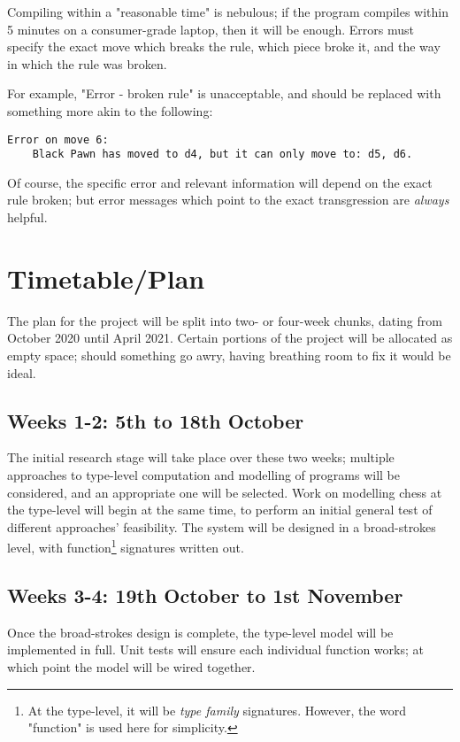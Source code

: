 \documentclass[12pt, a4paper]{scrartcl}
\begin{document}
Compiling within a "reasonable time" is nebulous; if the program compiles within 5 minutes on a consumer-grade laptop, then it will be enough. Errors must specify the exact move which breaks the rule, which piece broke it, and the way in which the rule was broken.

For example, "Error - broken rule" is unacceptable, and should be replaced with something more akin to the following:

\begin{lstlisting}
Error on move 6:
    Black Pawn has moved to d4, but it can only move to: d5, d6.
\end{lstlisting}

Of course, the specific error and relevant information will depend on the exact rule broken; but error messages which point to the exact transgression are \emph{always} helpful.

\section{Timetable/Plan}

The plan for the project will be split into two- or four-week chunks, dating from October 2020 until April 2021. Certain portions of the project will be allocated as empty space; should something go awry, having breathing room to fix it would be ideal.

\subsection{Weeks 1-2: 5th to 18th October}

The initial research stage will take place over these two weeks; multiple approaches to type-level computation and modelling of programs will be considered, and an appropriate one will be selected. Work on modelling chess at the type-level will begin at the same time, to perform an initial general test of different approaches' feasibility. The system will be designed in a broad-strokes level, with function\footnote{At the type-level, it will be \emph{type family} signatures. However, the word "function" is used here for simplicity.} signatures written out.

\subsection{Weeks 3-4: 19th October to 1st November}

Once the broad-strokes design is complete, the type-level model will be implemented in full. Unit tests will ensure each individual function works; at which point the model will be wired together.
\end{document}
